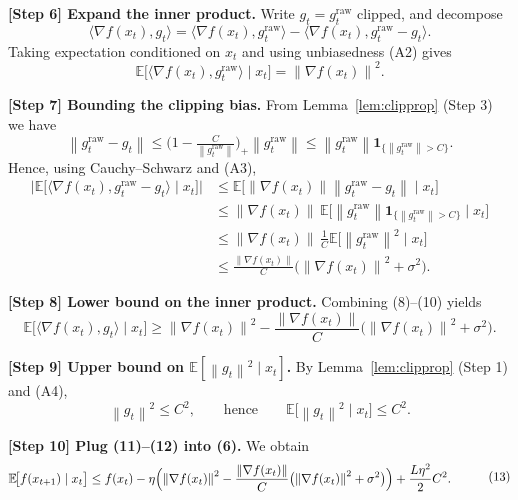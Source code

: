 \documentclass{article}
\newcommand{\E}{\mathbb{E}}
\newcommand{\norm}[1]{\left\lVert #1\right\rVert}
\begin{document}
\noindent\textbf{[Step 6] Expand the inner product.} Write $g_t = g_t^{\text{raw}}$ clipped, and decompose
\[
\langle\nabla f(x_t),g_t\rangle
   =\langle\nabla f(x_t),g_t^{\text{raw}}\rangle
    -\langle\nabla f(x_t),g_t^{\text{raw}}-g_t\rangle .
\tag{7}
\]
Taking expectation conditioned on $x_t$ and using unbiasedness (A2) gives
\[
\E\!\bigl[\langle\nabla f(x_t),g_t^{\text{raw}}\rangle\mid x_t\bigr]
   =\norm{\nabla f(x_t)}^{2}.
\tag{8}
\]

\noindent\textbf{[Step 7] Bounding the clipping bias.} From Lemma~\ref{lem:clipprop} (Step 3) we have
\[
\norm{g_t^{\text{raw}}-g_t}\le \bigl(1-\tfrac{C}{\norm{g_t^{\text{raw}}}}\bigr)_{+}\norm{g_t^{\text{raw}}}
\le \norm{g_t^{\text{raw}}}\mathbf{1}_{\{\norm{g_t^{\text{raw}}}>C\}} .
\tag{9}
\]
Hence, using Cauchy–Schwarz and (A3),
\[
\begin{aligned}
\bigl|\E\!\bigl[\langle\nabla f(x_t),g_t^{\text{raw}}-g_t\rangle\mid x_t\bigr]\bigr|
 &\le \E\!\bigl[\norm{\nabla f(x_t)}\norm{g_t^{\text{raw}}-g_t}\mid x_t\bigr]   \\
 &\le \norm{\nabla f(x_t)}\,
        \E\!\bigl[\norm{g_t^{\text{raw}}}\mathbf{1}_{\{\norm{g_t^{\text{raw}}}>C\}} \mid x_t\bigr]  \\
 &\le \norm{\nabla f(x_t)}\,
        \frac{1}{C}\E\!\bigl[\norm{g_t^{\text{raw}}}^{2}\mid x_t\bigr]            \\
 &\le \frac{\norm{\nabla f(x_t)}}{C}
        \bigl(\norm{\nabla f(x_t)}^{2}+\sigma^{2}\bigr) .
\end{aligned}
\tag{10}
\]

\noindent\textbf{[Step 8] Lower bound on the inner product.} Combining (8)–(10) yields
\[
\E\!\bigl[\langle\nabla f(x_t),g_t\rangle\mid x_t\bigr]
\ge \norm{\nabla f(x_t)}^{2}
      -\frac{\norm{\nabla f(x_t)}}{C}\bigl(\norm{\nabla f(x_t)}^{2}+\sigma^{2}\bigr).
\tag{11}
\]

\noindent\textbf{[Step 9] Upper bound on $\E[\norm{g_t}^{2}\mid x_t]$.} By Lemma~\ref{lem:clipprop} (Step 1) and (A4),
\[
\norm{g_t}^{2}\le C^{2},\qquad\text{hence}\qquad
\E\!\bigl[\norm{g_t}^{2}\mid x_t\bigr]\le C^{2}.
\tag{12}
\]

\noindent\textbf{[Step 10] Plug (11)–(12) into (6).} We obtain
\[
\begin{aligned}
\E\!\bigl[f(x_{t+1})\mid x_t\bigr]
 &\le f(x_t)-\eta\Bigl(\norm{\nabla f(x_t)}^{2}
          -\frac{\norm{\nabla f(x_t)}}{C}\bigl(\norm{\nabla f(x_t)}^{2}+\sigma^{2}\bigr)\Bigr)
          +\frac{L\eta^{2}}{2}C^{2}.
\end{aligned}
\tag{13}
\]
\end{document}
